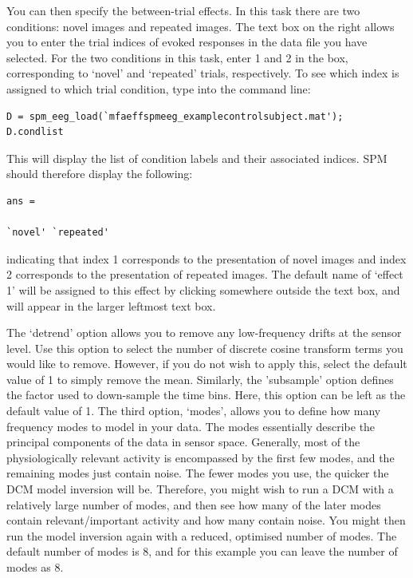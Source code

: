 You can then specify the between-trial effects. In this task there are
two conditions: novel images and repeated images. The text box on the
right allows you to enter the trial indices of evoked responses in the
data file you have selected. For the two conditions in this task, enter
1 and 2 in the box, corresponding to `novel' and `repeated' trials,
respectively. To see which index is assigned to which trial condition,
type into the command line:

\begin{verbatim}
D = spm_eeg_load(`mfaeffspmeeg_examplecontrolsubject.mat');
D.condlist
\end{verbatim}

This will display the list of condition labels and their associated
indices. SPM should therefore display the following:

\begin{verbatim}
ans =

`novel' `repeated'
\end{verbatim}

indicating that index 1 corresponds to the presentation of novel images
and index 2 corresponds to the presentation of repeated images. The
default name of `effect 1' will be assigned to this effect by clicking
somewhere outside the text box, and will appear in the larger leftmost
text box.

The `detrend' option allows you to remove any low-frequency drifts at
the sensor level. Use this option to select the number of discrete
cosine transform terms you would like to remove. However, if you do not
wish to apply this, select the default value of 1 to simply remove the
mean. Similarly, the 'subsample' option defines the factor used to
down-sample the time bins. Here, this option can be left as the default
value of 1. The third option, `modes', allows you to define how many
frequency modes to model in your data. The modes essentially describe
the principal components of the data in sensor space. Generally, most of
the physiologically relevant activity is encompassed by the first few
modes, and the remaining modes just contain noise. The fewer modes you
use, the quicker the DCM model inversion will be. Therefore, you might
wish to run a DCM with a relatively large number of modes, and then see
how many of the later modes contain relevant/important activity and how
many contain noise. You might then run the model inversion again with a
reduced, optimised number of modes. The default number of modes is 8,
and for this example you can leave the number of modes as 8.

